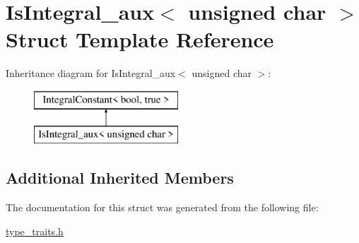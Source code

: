 \hypertarget{struct_is_integral__aux_3_01unsigned_01char_01_4}{}\section{Is\+Integral\+\_\+aux$<$ unsigned char $>$ Struct Template Reference}
\label{struct_is_integral__aux_3_01unsigned_01char_01_4}
Inheritance diagram for Is\+Integral\+\_\+aux$<$ unsigned char $>$\+:\begin{figure}[H]
\begin{center}
\leavevmode
\includegraphics[height=2.000000cm]{struct_is_integral__aux_3_01unsigned_01char_01_4}
\end{center}
\end{figure}
\subsection*{Additional Inherited Members}


The documentation for this struct was generated from the following file\+:\begin{DoxyCompactItemize}
\item 
\hyperlink{type__traits_8h}{type\+\_\+traits.\+h}\end{DoxyCompactItemize}
